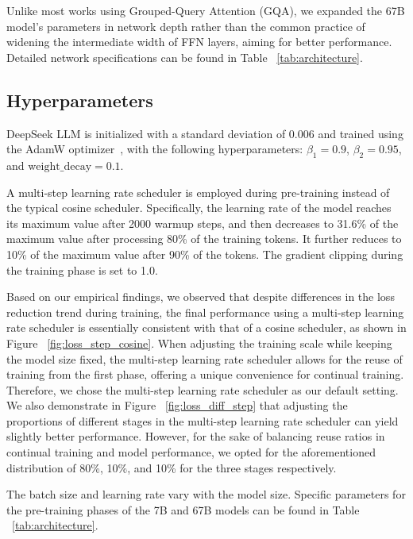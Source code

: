 Unlike most works using Grouped-Query Attention (GQA), we expanded the 67B model's parameters in network depth rather than the common practice of widening the intermediate width of FFN layers, aiming for better performance. Detailed network specifications can be found in Table ~\ref{tab:architecture}.

\subsection{Hyperparameters}
\label{sec:intro-hyper-params}
DeepSeek LLM is initialized with a standard deviation of 0.006 and trained using the AdamW optimizer~\citep{adamW}, with the following hyperparameters: $\beta_1=0.9$, $\beta_2=0.95$, and $\mathrm{weight\_decay}=0.1$.

A multi-step learning rate scheduler is employed during pre-training instead of the typical cosine scheduler. Specifically, the learning rate of the model reaches its maximum value after 2000 warmup steps, and then decreases to 31.6\% of the maximum value after processing 80\% of the training tokens. It further reduces to 10\% of the maximum value after 90\% of the tokens. The gradient clipping during the training phase is set to 1.0. 

Based on our empirical findings, we observed that despite differences in the loss reduction trend during training, the final performance using a multi-step learning rate scheduler is essentially consistent with that of a cosine scheduler, as shown in Figure ~\ref{fig:loss_step_cosine}. When adjusting the training scale while keeping the model size fixed, the multi-step learning rate scheduler allows for the reuse of training from the first phase, offering a unique convenience for continual training. Therefore, we chose the multi-step learning rate scheduler as our default setting. We also demonstrate in Figure ~\ref{fig:loss_diff_step} that adjusting the proportions of different stages in the multi-step learning rate scheduler can yield slightly better performance. However, for the sake of balancing reuse ratios in continual training and model performance, we opted for the aforementioned distribution of 80\%, 10\%, and 10\% for the three stages respectively.

The batch size and learning rate vary with the model size. Specific parameters for the pre-training phases of the 7B and 67B models can be found in Table ~\ref{tab:architecture}.

